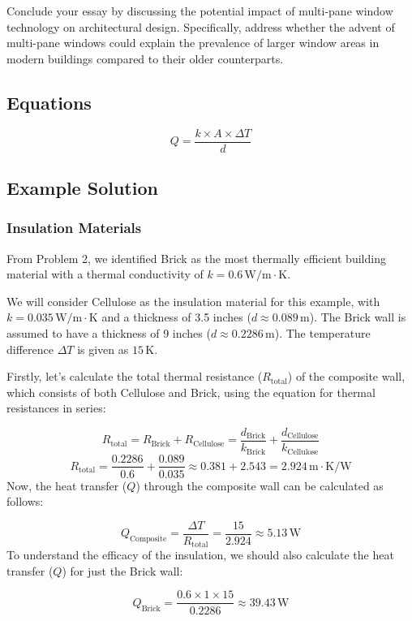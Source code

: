 \documentclass[12pt]{article}
\begin{document}
Conclude your essay by discussing the potential impact of multi-pane window technology on architectural design. Specifically, address whether the advent of multi-pane windows could explain the prevalence of larger window areas in modern buildings compared to their older counterparts.

\subsection*{Equations}
\[
Q = \frac{k \times A \times \Delta T}{d}
\]

\newpage
\subsection*{Example Solution}
\subsubsection*{Insulation Materials}

From Problem 2, we identified Brick as the most thermally efficient building material with a thermal conductivity of \( k = 0.6 \, \text{W/m}\cdot\text{K} \).

We will consider Cellulose as the insulation material for this example, with \( k = 0.035 \, \text{W/m}\cdot\text{K} \) and a thickness of 3.5 inches (\(d \approx 0.089 \, \text{m}\)). The Brick wall is assumed to have a thickness of 9 inches (\(d \approx 0.2286 \, \text{m}\)). The temperature difference \(\Delta T\) is given as \(15 \, \text{K}\).

Firstly, let's calculate the total thermal resistance (\( R_{\text{total}} \)) of the composite wall, which consists of both Cellulose and Brick, using the equation for thermal resistances in series:

\[
R_{\text{total}} = R_{\text{Brick}} + R_{\text{Cellulose}} = \frac{d_{\text{Brick}}}{k_{\text{Brick}}} + \frac{d_{\text{Cellulose}}}{k_{\text{Cellulose}}}
\]
\[
R_{\text{total}} = \frac{0.2286}{0.6} + \frac{0.089}{0.035} \approx 0.381 + 2.543 = 2.924 \, \text{m}\cdot\text{K/W}
\]
Now, the heat transfer (\( Q \)) through the composite wall can be calculated as follows:

\[
Q_{\text{Composite}} = \frac{\Delta T}{R_{\text{total}}} = \frac{15}{2.924} \approx 5.13 \, \text{W}
\]
To understand the efficacy of the insulation, we should also calculate the heat transfer (\( Q \)) for just the Brick wall:

\[
Q_{\text{Brick}} = \frac{0.6 \times 1 \times 15}{0.2286} \approx 39.43 \, \text{W}
\]
\end{document}
